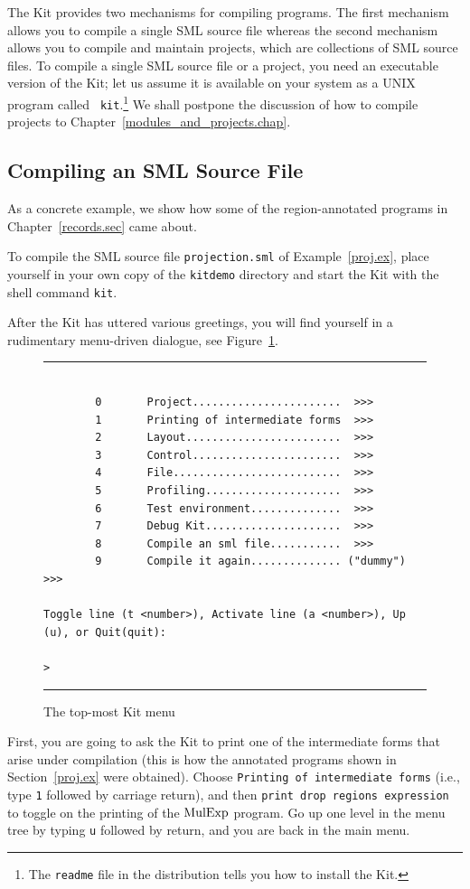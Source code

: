 \documentclass[12pt]{book}
\begin{document}
The Kit provides two mechanisms for compiling programs. The first
mechanism allows you to compile a single SML source file whereas the
second mechanism allows you to compile and maintain projects, which
are collections of SML source files. To compile a single SML source
file or a project, you need an executable version of the Kit; let us
assume it is available on your system as a UNIX program called {\tt
  kit}.\footnote{The {\tt readme} file in the distribution tells you
  how to install the Kit.}  We shall postpone the discussion of how to
compile projects to Chapter~\ref{modules_and_projects.chap}.

\subsection{Compiling an SML Source File}
As a concrete example, we show how some of the region-annotated programs in
Chapter~\ref{records.sec} came about.

To compile the SML source file {\tt projection.sml} of
Example~\ref{proj.ex}, place yourself in your own copy of the {\tt kitdemo} directory
and start the Kit with the shell
command {\tt kit}.

After the Kit has uttered various greetings, you will find yourself in
a rudimentary menu-driven dialogue, see Figure~\ref{dialogue.fig}.
\begin{figure}
\hrule
\begin{verbatim}

        0       Project.......................  >>>
        1       Printing of intermediate forms  >>>
        2       Layout........................  >>>
        3       Control.......................  >>>
        4       File..........................  >>>
        5       Profiling.....................  >>>
        6       Test environment..............  >>>
        7       Debug Kit.....................  >>>
        8       Compile an sml file...........  >>>
        9       Compile it again.............. ("dummy") >>>

Toggle line (t <number>), Activate line (a <number>), Up (u), or Quit(quit): 

>
\end{verbatim}
\caption{The top-most Kit menu}
\hrule
\label{dialogue.fig}
\end{figure}
First, you are going to ask the Kit to print one of the intermediate
forms that arise under compilation (this is how the annotated programs
shown in  Section~\ref{proj.ex} were obtained). 
Choose \texttt{Printing of intermediate forms} (i.e., type \texttt{1}
followed by carriage return), and then \texttt{print drop regions
expression} to toggle on the printing of the $\hbox{\rm MulExp}$ program.
Go up one level in the menu tree by typing \texttt{u} followed by return,
and you are back in the main menu.
\end{document}
